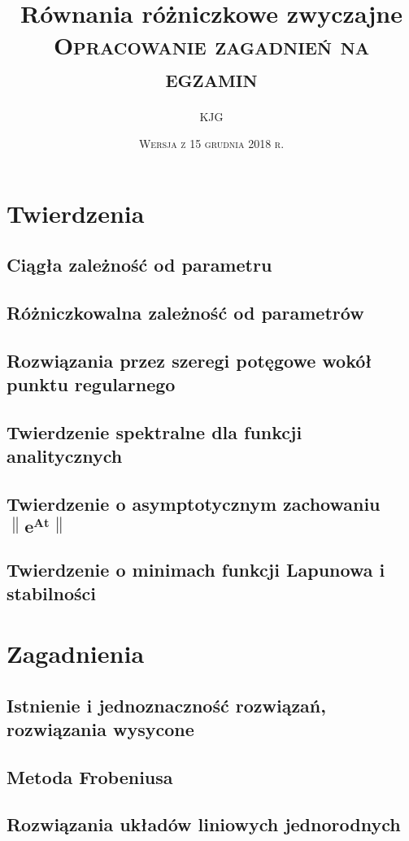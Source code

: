 \documentclass{mwart}
\title{
  \Huge {\bfseries Równania różniczkowe zwyczajne} \\
  \Large {\scshape Opracowanie zagadnień na egzamin}
}
\author{{\scshape KJG}}
\date{{\scshape Wersja z 15 grudnia 2018 r.}}
\begin{document}
	
  \maketitle
  \newpage
  
  \tableofcontents
  \newpage
  
  \section{Twierdzenia}
    \subsection{Ciągła zależność od parametru}
    \subsection{Różniczkowalna zależność od parametrów}
    \subsection{Rozwiązania przez szeregi potęgowe wokół punktu regularnego}
    \subsection{Twierdzenie spektralne dla funkcji analitycznych}
    \subsection{Twierdzenie o asymptotycznym zachowaniu $\mathbf{\left\lVert e^{At} \right\rVert}$}
    \subsection{Twierdzenie o minimach funkcji Lapunowa i stabilności}
  
  \section{Zagadnienia}
    \subsection{Istnienie i jednoznaczność rozwiązań, rozwiązania wysycone}
      
    \subsection{Metoda Frobeniusa}
    \subsection{Rozwiązania układów liniowych jednorodnych}
\end{document}
